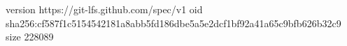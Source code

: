 version https://git-lfs.github.com/spec/v1
oid sha256:cf587f1c5154542181a8abb5fd186dbe5a5e2dcf1bf92a41a65c9bfb626b32c9
size 228089
